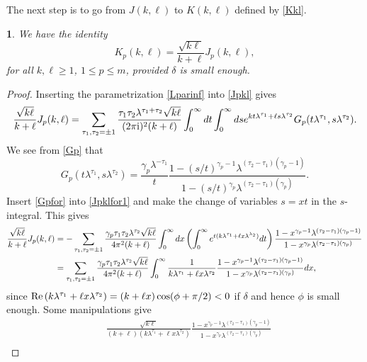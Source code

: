 \documentclass{article}
\numberwithin{equation}{section}
\numberwithin{figure}{section}
\theoremstyle{plain}
\theoremstyle{plain}
\newtheorem{lemma}[thm]{\protect\lemmaname}
\numberwithin{thm}{section}
\theoremstyle{remark}
\providecommand{\lemmaname}{Lemma}
\newcommand{\re}{\text{{\rm Re}\,}}
\newcommand{\I}{{\rm i}}
\let \le \leqslant
\let \ge \geqslant
\begin{document}
The next step is to go from $J(k,\ell)$ to $K(k,\ell)$ defined by \eqref{Kkl}.
\begin{lemma}\label{Lem:JklKkl}
We have the identity
\begin{equation}\label{JklKkl}
K_p(k,\ell)=\frac{\sqrt{k\ell}}{k+\ell}J_p(k,\ell),
\end{equation}
for all $k,\ell\ge 1$, $1\le p\le m$, provided $\delta$ is small enough.
\end{lemma}

\begin{proof}
Inserting the parametrization \eqref{Lparinf} into \eqref{Jpkl} gives
\begin{equation}\label{Jpklfor1}
\frac{\sqrt{k\ell}}{k+\ell}J_p(k,\ell)=\sum_{\tau_1,\tau_2=\pm 1}\frac{\tau_1\tau_2\lambda^{\tau_1+\tau_2}\sqrt{k\ell}}{(2\pi\I)^2(k+\ell)}
\int_0^\infty dt\int_0^\infty ds e^{kt\lambda^{\tau_1}+\ell s\lambda^{\tau_2}}G_p(t\lambda^{\tau_1},s\lambda^{\tau_2}).
\end{equation}
We see from \eqref{Gp} that
\begin{equation}\label{Gpfor}
G_p(t\lambda^{\tau_1},s\lambda^{\tau_2})=\frac{\gamma_p\lambda^{-\tau_1}}t\frac{
1-(s/t)^{\gamma_p-1}\lambda^{(\tau_2-\tau_1)(\gamma_p-1)}}{1-(s/t)^{\gamma_p}\lambda^{(\tau_2-\tau_1)(\gamma_p)}}.
\end{equation}
Insert \eqref{Gpfor} into \eqref{Jpklfor1} and make the change of variables $s=xt$ in the $s$-integral. This gives
\begin{align}\label{Jpklfor2}
\frac{\sqrt{k\ell}}{k+\ell}J_p(k,\ell)&=-\sum_{\tau_1,\tau_2=\pm 1}\frac{\gamma_p\tau_1\tau_2\lambda^{\tau_2}\sqrt{k\ell}}{4\pi^2(k+\ell)}
\int_0^\infty dx\left(\int_0^\infty e^{t(k\lambda^{\tau_1}+\ell x\lambda^{\lambda_2})}dt\right)
\frac{1-x^{\gamma_p-1}\lambda^{(\tau_2-\tau_1)(\gamma_p-1)}}{1-x^{\gamma_p}\lambda^{(\tau_2-\tau_1)(\gamma_p)}}\notag\\
&=\sum_{\tau_1,\tau_2=\pm 1}\frac{\gamma_p\tau_1\tau_2\lambda^{\tau_2}\sqrt{k\ell}}{4\pi^2(k+\ell)}\int_0^\infty
\frac 1{k\lambda^{\tau_1}+\ell x\lambda^{\tau_2}}\frac{1-x^{\gamma_p-1}\lambda^{(\tau_2-\tau_1)(\gamma_p-1)}}{1-x^{\gamma_p}\lambda^{(\tau_2-\tau_1)(\gamma_p)}}dx,
\end{align}
since $\re(k\lambda^{\tau_1}+\ell x\lambda^{\tau_2})=(k+\ell x)\cos(\phi+\pi/2)<0$ if $\delta$ and hence $\phi$ is small enough. Some manipulations give
\begin{align*}
&\frac {\sqrt{k\ell}}{(k+\ell)(k\lambda^{\tau_1}+\ell x\lambda^{\tau_2})}\frac{1-x^{\gamma_p-1}\lambda^{(\tau_2-\tau_1)(\gamma_p-1)}}{1-x^{\gamma_p}\lambda^{(\tau_2-\tau_1)(\gamma_p)}}\\

\end{align*}
\end{proof}
\end{document}
